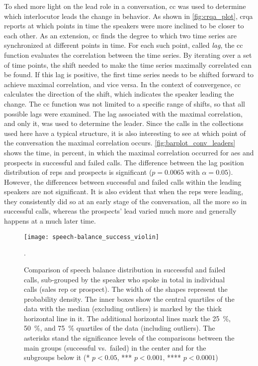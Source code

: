 To shed more light on the lead role in a conversation, \acl{cc} was used to determine which interlocutor leads the change in behavior.
As shown in \cref{fig:crqa_plot}, \ac{crqa} reports at which points in time the speakers were more inclined to be closer to each other.
As an extension, \acl{cc} finds the degree to which two time series are synchronized at different points in time.
For each such point, called \emph{lag}, the \acl{cc} function evaluates the correlation between the time series.
By iterating over a set of time points, the shift needed to make the time series maximally correlated can be found.
If this lag is positive, the first time series needs to be shifted forward to achieve maximal correlation, and vice versa.
In the context of convergence, \acl{cc} calculates the direction of the shift, which indicates the speaker leading the change.
The \acl{cc} function was not limited to a specific range of shifts, so that all possible lags were examined.
The lag associated with the maximal correlation, and only it, was used to determine the leader.
Since the calls in the collections used here have a typical structure, it is also interesting to see at which point of the conversation the maximal correlation occurs.
\cref{fig:barplot_conv_leaders} shows the time, in percent, in which the maximal correlation occurred for \acp{ae} and prospects in successful and failed calls.
The difference between the lag position distribution of reps and prospects is significant ($p = 0.0065$ with $\alpha = 0.05$).
However, the differences between successful and failed calls within the leading speakers are not significant.
It is also evident that when the reps were leading, they consistently did so at an early stage of the conversation, all the more so in successful calls, whereas the prospects' lead varied much more and generally happens at a much later time.
%
\begin{figure}[H]
	\centering
	\texttt{[image: speech-balance\_success\_violin]}
	\caption[Distribution of speech balance in successful and failed calls]
		{Comparison of speech balance distribution in successful and failed calls, sub-grouped by the speaker who spoke in total in individual calls (sales rep or prospect).
		The width of the shapes represent the probability density.
		The inner boxes show the central quartiles of the data with the median (excluding outliers) is marked by the thick horizontal line in it.
		The additional horizontal lines mark the \SI{25}{\percent}, \SI{50}{\percent}, and \SI{75}{\percent} quartiles of the data (including outliers).
		The asterisks stand the significance levels of the comparisons between the main groups (successful vs.\ failed) in the center and for the subgroups below it (* $p < 0.05$, *** $p < 0.001$, **** $p < 0.0001$)}.
	\label{fig:speech-balance_success_violin}
\end{figure}
